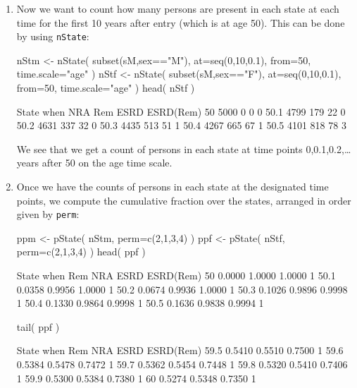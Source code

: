 \begin{enumerate}[resume]
\item Now we want to count how many persons are present in each state
  at each time for the first 10 years after entry (which is at age 50). This
  can be done by using \texttt{nState}:
\begin{Schunk}
\begin{Sinput}
 nStm <- nState( subset(sM,sex=="M"), at=seq(0,10,0.1), from=50, time.scale="age" )
 nStf <- nState( subset(sM,sex=="F"), at=seq(0,10,0.1), from=50, time.scale="age" )
 head( nStf )
\end{Sinput}
\begin{Soutput}
      State
when    NRA  Rem ESRD ESRD(Rem)
  50   5000    0    0         0
  50.1 4799  179   22         0
  50.2 4631  337   32         0
  50.3 4435  513   51         1
  50.4 4267  665   67         1
  50.5 4101  818   78         3
\end{Soutput}
\end{Schunk}
  We see that we get a count of persons in each state at time points
  0,0.1,0.2,\ldots years after 50 on the age time scale.

    
\item Once we have the counts of persons in each state at the
  designated time points, we compute the cumulative fraction over the
  states, arranged in order given by \texttt{perm}:
\begin{Schunk}
\begin{Sinput}
 ppm <- pState( nStm, perm=c(2,1,3,4) )
 ppf <- pState( nStf, perm=c(2,1,3,4) )
 head( ppf )
\end{Sinput}
\begin{Soutput}
      State
when      Rem    NRA   ESRD ESRD(Rem)
  50   0.0000 1.0000 1.0000         1
  50.1 0.0358 0.9956 1.0000         1
  50.2 0.0674 0.9936 1.0000         1
  50.3 0.1026 0.9896 0.9998         1
  50.4 0.1330 0.9864 0.9998         1
  50.5 0.1636 0.9838 0.9994         1
\end{Soutput}
\begin{Sinput}
 tail( ppf )
\end{Sinput}
\begin{Soutput}
      State
when      Rem    NRA   ESRD ESRD(Rem)
  59.5 0.5410 0.5510 0.7500         1
  59.6 0.5384 0.5478 0.7472         1
  59.7 0.5362 0.5454 0.7448         1
  59.8 0.5320 0.5410 0.7406         1
  59.9 0.5300 0.5384 0.7380         1
  60   0.5274 0.5348 0.7350         1
\end{Soutput}
\end{Schunk}



\end{enumerate}
